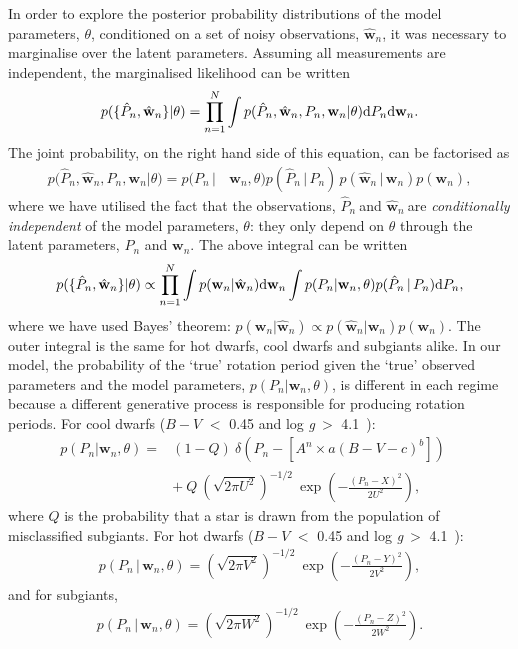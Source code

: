 \documentclass[11pt,preprint]{aastex}
\newcommand{\logg}{log \emph{g}}
\newcommand{\w}{\mathbf{w}}
\newcommand{\wh}{$\hat{\mathbf{w}}_n$}
\newcommand{\ph}{$\hat{P}_n$}
\newcommand{\subcut}{4.1~}
\begin{document}
In order to explore the posterior probability distributions of the model
parameters, $\theta$, conditioned on a set of noisy observations, \wh, it was
necessary to marginalise over the latent parameters.
Assuming all measurements are independent, the marginalised likelihood can be
written
\begin{equation}
	p(\{\hat{P}_n,\hat{\w}_n\}|\theta) =
	\prod_{n=1}^{N} \int p(\hat{P}_n,\hat{\w}_n,P_n,\w_n|\theta)
	{\rm d}P_n {\rm d}\w_n.
\label{eq:fulll}
\end{equation}
The joint probability, on the right hand side of this equation, can be
factorised as
\begin{align}
	p(\hat{P}_n,\hat{\w}_n,P_n,\w_n|\theta) = p(P_n\,| & \,\w_n,\theta)
	p(\hat{P}_n\,|\,P_n)\,p(\hat{\w}_n\,|\,\w_n)p(\w_n),
\nonumber
\end{align}
where we have utilised the fact that the observations, \ph$~$and \wh$~$are
{\it conditionally independent} of the model parameters, $\theta$: they only
depend on $\theta$ through the latent parameters, $P_n$ and $\w_n$.
The above integral can  be written
\begin{equation}
	p(\{\hat{P}_n,\hat{\w}_n\}|\theta) \propto
	\prod_{n=1}^{N} \int p(\w_n|\hat{\w}_n)
	{\rm d}\w_n \int p(P_n|\w_n,\theta) p(\hat{P}_n\,|\,P_n) {\rm d}P_n,
\label{eq:fac}
\end{equation}
where we have used Bayes' theorem:
$p(\w_n|\hat{\w}_n) \propto p(\hat{\w}_n|\w_n)p(\w_n)$.
The outer integral is the same for hot dwarfs, cool dwarfs and subgiants
alike.
In our model, the probability of the `true' rotation period given the `true'
observed parameters and the model parameters, $p(P_n|\w_n, \theta)$, is
different in each regime because a different generative process is responsible
for producing rotation periods.
For cool dwarfs ($B-V$ $<$ 0.45 and \logg$~>$ \subcut):
\begin{eqnarray}
	p(P_n|\w_n,\theta) =
	& (1-Q)~\delta \left (P_n - \left[A^n \times a(B-V - c)^b\right]
	\right) \quad \\ & +~Q~\left(\sqrt{2\pi U^2}\right)^{-1/2}
	~\exp\left({-\frac{(P_n-X)^2}{2U^2}}\right),
\end{eqnarray}
where $Q$ is the probability that a star is drawn from the population of
misclassified subgiants.
For hot dwarfs ($B-V$ $<$ 0.45 and \logg$~>$ \subcut):
\begin{eqnarray}
p(P_n\,|\,\w_n,\theta) = \left(\sqrt{2\pi V^2}\right)^{-1/2}~
\exp\left({-\frac{(P_n-Y)^2}{2V^2}}\right),
\end{eqnarray}
and for subgiants,
\begin{eqnarray}
p(P_n\,|\,\w_n,\theta) = \left(\sqrt{2\pi W^2}\right)^{-1/2}~
\exp\left({-\frac{(P_n-Z)^2}{2W^2}}\right).
\end{eqnarray}
\end{document}
